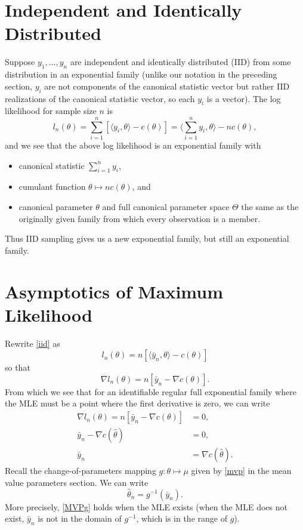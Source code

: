 \documentclass[12pt]{article}
\newcommand{\inner}[1]{\langle #1 \rangle}
\begin{document}
\section*{Independent and Identically Distributed}

Suppose $y_1, \ldots, y_n$ are independent and identically distributed (IID) from some distribution in an exponential family (unlike our notation in the preceding section, $y_i$ are not components of the canonical statistic vector but rather IID realizations of the canonical statistic vector, so each $y_i$ is a vector). The log likelihood for sample size $n$ is
\begin{equation} \label{iid}
	l_n(\theta) = \sum_{i=1}^n\left[\inner{y_i,\theta} - c(\theta)\right] 
	  = \inner{\sum_{i=1}^n y_i, \theta} - n c(\theta),
\end{equation}
and we see that the above log likelihood is an exponential family with 
\begin{itemize}
 \item canonical statistic $\sum_{i=1}^n y_i$,
 \item cumulant function $\theta \mapsto n c(\theta)$, and
 \item canonical parameter $\theta$ and full canonical parameter space $\Theta$ the same as the originally given family from which every observation is a member.
\end{itemize}
Thus IID sampling gives us a new exponential family, but still an exponential family.


\section*{Asymptotics of Maximum Likelihood}

Rewrite \eqref{iid} as 
$$
  l_n(\theta) = n\left[\inner{\bar y_n, \theta} - c(\theta)\right]
$$
so that
$$
  \nabla l_n(\theta) = n\left[\bar y_n - \nabla c(\theta)\right].
$$
From which we see that for an identifiable regular full exponential family where the MLE must be a point where the first derivative is zero, we can write
\begin{align*}
  	\nabla l_n(\theta) = n\left[\bar y_n - \nabla c(\theta)\right] &= 0, \\
  	\bar y_n - \nabla c(\hat\theta) &= 0, \\
  	\bar y_n &= \nabla c(\hat\theta).
\end{align*}
Recall the change-of-parameters mapping $g:\theta \mapsto \mu$ given by \eqref{mvp} in the mean value parameters section. We can write
\begin{equation} \label{MVPg}
  \hat\theta_n = g^{-1}(\bar y_n).	
\end{equation}
More precisely, \eqref{MVPg} holds when the MLE exists (when the MLE does not exist, $\bar y_n$ is not in the domain of $g^{-1}$, which is in the range of $g$).
 
\end{document}
